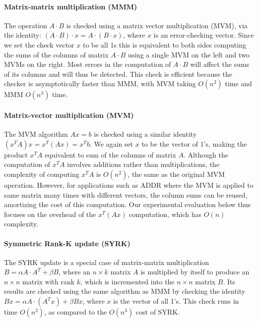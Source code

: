 \documentclass{sig-alternate}
\begin{document}
\vspace{-5pt}
\paragraph{Matrix-matrix multiplication (MMM)}
The operation $A \cdot B$ is checked using a matrix vector multiplication (MVM), via the identity: $(A \cdot B) \cdot x = A \cdot (B \cdot x)$, where $x$ is an error-checking vector.
Since we set the check vector $x$ to be all 1s this is equivalent to both sides computing the sums of the columns of matrix $A \cdot B$ using a single MVM on the left and two MVMs on the right.
Most errors in the computation of $A \cdot B$ will affect the sums of its columns and will thus be detected.
This check is efficient because the checker is asymptotically faster than MMM, with MVM taking $O(n^2)$ time and MMM $O(n^3)$ time.

\vspace{-5pt}
\paragraph{Matrix-vector multiplication (MVM)}
The MVM algorithm $Ax=b$ is checked using a similar identity $(x^TA)x = x^T(Ax) = x^Tb$.
We again set $x$ to be the vector of 1's, making the product $x^TA$ equivalent to sum of the columns of matrix $A$.
Although the computation of $x^TA$ involves additions rather than multiplications, the complexity of computing $x^TA$ is $O(n^2)$, the same as the original MVM operation.
However, for applications such as ADDR where the MVM is applied to same matrix many times with different vectors, the column sums can be reused, amortizing the cost of this computation.
Our experimental evaluation below thus focuses on the overhead of the $x^T(Ax)$ computation, which has $O(n)$ complexity.

\vspace{-5pt}
\paragraph{Symmetric Rank-K update (SYRK)}
The SYRK update is a special case of matrix-matrix multiplication $B = \alpha A \cdot A^T + \beta B$, where an $n \times k$ matrix $A$ is multiplied by itself to produce an $n \times n$ matrix with rank $k$, which is incremented into the $n \times n$ matrix $B$.
Its results are checked using the same algorithm as MMM by checking the identity $B x = \alpha A \cdot (A^Tx) + \beta B x$, where $x$ is the vector of all 1's.
This check runs in time $O(n^2)$, as compared to the $O(n^3)$ cost of SYRK.
\end{document}
